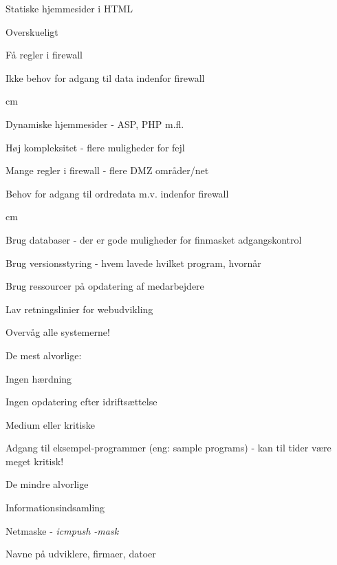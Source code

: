 \begin{list1}
\item Statiske hjemmesider i HTML
\item Overskueligt
\item Få regler i firewall
\item Ikke behov for adgang til data indenfor firewall
\end{list1}





 cm

\begin{list1}
\item Dynamiske hjemmesider - ASP, PHP m.fl.
\item Høj kompleksitet - flere muligheder for fejl
\item Mange regler i firewall - flere DMZ områder/net
\item Behov for adgang til ordredata m.v. indenfor firewall
\end{list1}



 cm

\begin{list1}
\item Brug databaser - der er gode muligheder for finmasket adgangskontrol
\item Brug versionsstyring - hvem lavede hvilket program, hvornår
\item Brug ressourcer på opdatering af medarbejdere
\item Lav retningslinier for webudvikling
\item Overvåg alle systemerne!
\end{list1}


\begin{list1}
\item De mest alvorlige:
  \begin{list2}  
\item Ingen hærdning
\item Ingen opdatering efter idriftsættelse
\end{list2}
\item Medium eller kritiske
  \begin{list2}
  \item Adgang til eksempel-programmer (eng: sample programs)
    - kan til tider være meget kritisk!
  \end{list2}
\item De mindre alvorlige
  \begin{list2}
  \item Informationsindsamling
  \item Netmaske - \emph{icmpush -mask}
  \item Navne på udviklere, firmaer, datoer
  \end{list2}
\end{list1}


